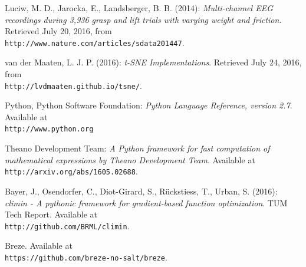 \documentclass{article} %
\begin{document}
\begin{thebibliography}{9}
	Luciw, M. D., Jarocka, E., Landsberger, B. B. (2014): 
	\textit{Multi-channel EEG recordings during 3,936 grasp and lift trials with varying weight and friction}. 
	 Retrieved July 20, 2016, from \\\texttt{http://www.nature.com/articles/sdata201447}.
	
	van der Maaten, L. J. P. (2016): 
	\textit{t-SNE Implementations}.
	Retrieved July 24, 2016, from \\\texttt{http://lvdmaaten.github.io/tsne/}.
	
	Python, Python Software Foundation:
	\textit{Python Language Reference, version 2.7}.
	Available at \\\texttt{http://www.python.org}
	
	Theano Development Team:
	\textit{A Python framework for fast computation of mathematical expressions by Theano Development Team}.
	Available at \\\texttt{http://arxiv.org/abs/1605.02688}.
	
	Bayer, J., Osendorfer, C., Diot-Girard, S., Rückstiess, T., Urban, S. (2016):
	\textit{climin - A pythonic framework for gradient-based function optimization}.
	 TUM Tech Report. Available at \\\texttt{http://github.com/BRML/climin}.
	 
	 Breze.
	 Available at \\\texttt{https://github.com/breze-no-salt/breze}.
\end{thebibliography}




\end{document}
